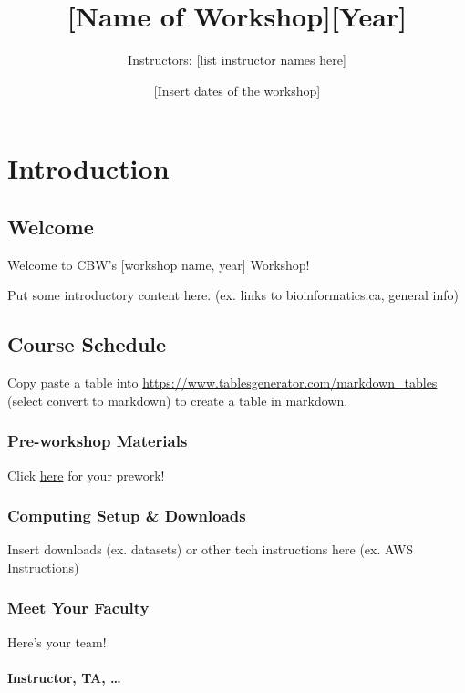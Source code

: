 \documentclass[
]{book}
\title{{[}Name of Workshop{]}{[}Year{]}}
\author{Instructors: {[}list instructor names here{]}}
\date{{[}Insert dates of the workshop{]}}
\begin{document}
\maketitle

{
\setcounter{tocdepth}{1}
\tableofcontents
}
\part{Introduction}\label{part-introduction}

\chapter{Welcome}\label{welcome}

Welcome to CBW's {[}workshop name, year{]} Workshop!

Put some introductory content here. (ex. links to bioinformatics.ca, general info)

\appendix


\chapter{Course Schedule}\label{course-schedule}

Copy paste a table into \url{https://www.tablesgenerator.com/markdown_tables} (select convert to markdown) to create a table in markdown.

\section{Pre-workshop Materials}\label{pre-workshop-materials}

Click \href{insert\%20link\%20here}{here} for your prework!

\section{Computing Setup \& Downloads}\label{computing-setup-downloads}

Insert downloads (ex. datasets) or other tech instructions here (ex. AWS Instructions)

\section{Meet Your Faculty}\label{meet-your-faculty}

Here's your team!

\subsection{Instructor, TA, \ldots{}}\label{instructor-ta}
\end{document}
